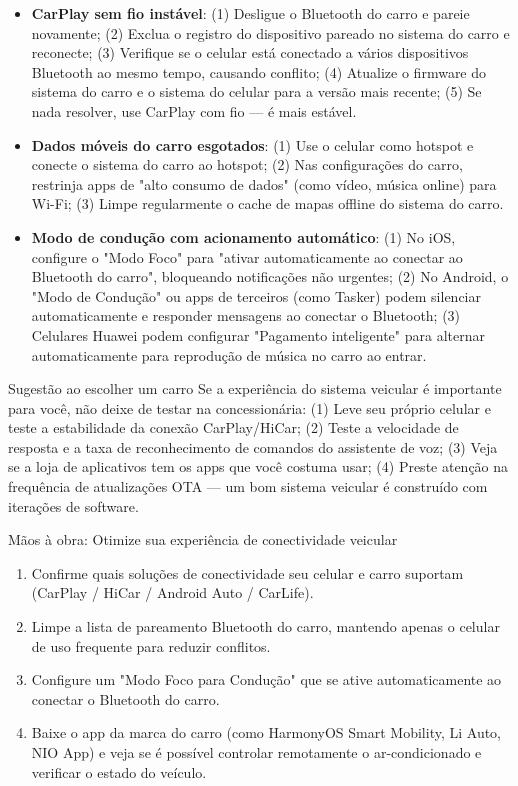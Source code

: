 \begin{itemize}
  \item \textbf{CarPlay sem fio instável}: (1) Desligue o Bluetooth do carro e pareie novamente; (2) Exclua o registro do dispositivo pareado no sistema do carro e reconecte; (3) Verifique se o celular está conectado a vários dispositivos Bluetooth ao mesmo tempo, causando conflito; (4) Atualize o firmware do sistema do carro e o sistema do celular para a versão mais recente; (5) Se nada resolver, use CarPlay com fio — é mais estável.
  \item \textbf{Dados móveis do carro esgotados}: (1) Use o celular como hotspot e conecte o sistema do carro ao hotspot; (2) Nas configurações do carro, restrinja apps de "alto consumo de dados" (como vídeo, música online) para Wi-Fi; (3) Limpe regularmente o cache de mapas offline do sistema do carro.
  \item \textbf{Modo de condução com acionamento automático}: (1) No iOS, configure o "Modo Foco" para "ativar automaticamente ao conectar ao Bluetooth do carro", bloqueando notificações não urgentes; (2) No Android, o "Modo de Condução" ou apps de terceiros (como Tasker) podem silenciar automaticamente e responder mensagens ao conectar o Bluetooth; (3) Celulares Huawei podem configurar "Pagamento inteligente" para alternar automaticamente para reprodução de música no carro ao entrar.
\end{itemize}

\begin{tcbinfo}{Sugestão ao escolher um carro}
Se a experiência do sistema veicular é importante para você, não deixe de testar na concessionária: (1) Leve seu próprio celular e teste a estabilidade da conexão CarPlay/HiCar; (2) Teste a velocidade de resposta e a taxa de reconhecimento de comandos do assistente de voz; (3) Veja se a loja de aplicativos tem os apps que você costuma usar; (4) Preste atenção na frequência de atualizações OTA — um bom sistema veicular é construído com iterações de software.

\end{tcbinfo}

\begin{tcbpractice}{Mãos à obra: Otimize sua experiência de conectividade veicular}
\begin{enumerate}
  \item Confirme quais soluções de conectividade seu celular e carro suportam (CarPlay / HiCar / Android Auto / CarLife).
  \item Limpe a lista de pareamento Bluetooth do carro, mantendo apenas o celular de uso frequente para reduzir conflitos.
  \item Configure um "Modo Foco para Condução" que se ative automaticamente ao conectar o Bluetooth do carro.
  \item Baixe o app da marca do carro (como HarmonyOS Smart Mobility, Li Auto, NIO App) e veja se é possível controlar remotamente o ar-condicionado e verificar o estado do veículo.
\end{enumerate}

\end{tcbpractice}

